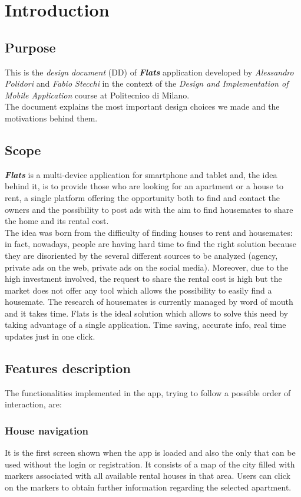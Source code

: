 \chapter{Introduction}

\section{Purpose}
This is the \textit{design document} (DD) of \textbf{\textit{Flats}} application developed by \textit{Alessandro Polidori} and \textit{Fabio Stecchi} in the context of the \textit{Design and Implementation of Mobile Application} course at Politecnico di Milano.\\
The document explains the most important design choices we made and the motivations behind them.

\section{Scope}
\textbf{\textit{Flats}} is a multi-device application for smartphone and tablet and, the idea behind it, is to provide those who are looking for an apartment or a house to rent, a single platform offering the opportunity both to find and contact the owners and the possibility to post ads with the aim to find housemates to share the home and its rental cost.\\
The idea was born from the difficulty of finding houses to rent and housemates: in fact, nowadays, people are having hard time to find the right solution because they are disoriented by the several different sources to be analyzed (agency, private ads on the web, private ads on the social media). Moreover, due to the high investment involved, the request to share the rental cost is high but the market does not offer any tool which allows the possibility to easily find a housemate. The research of housemates is currently managed by word of mouth and it takes time. Flats is the ideal solution which allows to solve this need by taking advantage of a single application. Time saving, accurate info, real time updates just in one click.  

\section{Features description}
The functionalities implemented in the app, trying to follow a possible
order of interaction, are:

\subsection{House navigation}
It is the first screen shown when the app is loaded and also the only that can be used without the login or registration. It consists of a map of the city filled with markers associated with all available rental houses in that area. Users can click on the markers to obtain further information regarding the selected apartment.

